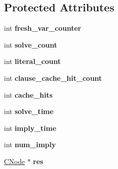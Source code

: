 \subsection*{\-Protected \-Attributes}
\begin{DoxyCompactItemize}
\item 
\hypertarget{classSolver_acab17162109917b090e1bb65db45410d}{int {\bfseries fresh\-\_\-var\-\_\-counter}}\label{classSolver_acab17162109917b090e1bb65db45410d}

\item 
\hypertarget{classSolver_a8bfe57e04a9266e094809eff9dac3b4d}{int {\bfseries solve\-\_\-count}}\label{classSolver_a8bfe57e04a9266e094809eff9dac3b4d}

\item 
\hypertarget{classSolver_acce9bd07ac7b9867f61526fff4841e05}{int {\bfseries literal\-\_\-count}}\label{classSolver_acce9bd07ac7b9867f61526fff4841e05}

\item 
\hypertarget{classSolver_a5b8a47d0b6d3c369820e61508a31d0d8}{int {\bfseries clause\-\_\-cache\-\_\-hit\-\_\-count}}\label{classSolver_a5b8a47d0b6d3c369820e61508a31d0d8}

\item 
\hypertarget{classSolver_ab06796fb4247203c201e1f82665c90b1}{int {\bfseries cache\-\_\-hits}}\label{classSolver_ab06796fb4247203c201e1f82665c90b1}

\item 
\hypertarget{classSolver_abe0ba64278604bddcb509c184aa0c67f}{int {\bfseries solve\-\_\-time}}\label{classSolver_abe0ba64278604bddcb509c184aa0c67f}

\item 
\hypertarget{classSolver_ab06ffb6630a36974bc3739cbd9024cb1}{int {\bfseries imply\-\_\-time}}\label{classSolver_ab06ffb6630a36974bc3739cbd9024cb1}

\item 
\hypertarget{classSolver_aa704e3e86465b7a38f58f792d9ffdb6b}{int {\bfseries num\-\_\-imply}}\label{classSolver_aa704e3e86465b7a38f58f792d9ffdb6b}

\item 
\hypertarget{classSolver_ab36720ab77cd7abd075fd0aaf6e40f22}{\hyperlink{classCNode}{\-C\-Node} $\ast$ {\bfseries res}}\label{classSolver_ab36720ab77cd7abd075fd0aaf6e40f22}

\end{DoxyCompactItemize}
